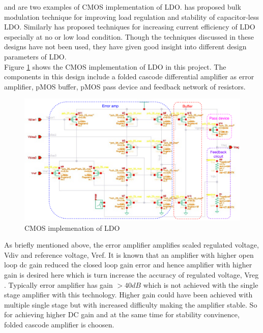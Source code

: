 \documentclass[12pt,a4paper,UKenglish]{article}
\begin{document}
\cite{ldo_bulkmod} and \cite{ldo_quiescent} are two examples of CMOS implementation of LDO. \cite{ldo_bulkmod} has proposed bulk modulation technique for improving load regulation and stability of capacitor-less LDO. Similarly \cite{ldo_quiescent} has  proposed techniques for increasing current efficiency of LDO especially at no or low load condition. Though the techniques discussed in these designs have not been used, they have given good insight into different design parameters of LDO.  \\

Figure \ref{ldo_cmos} shows the CMOS implementation of LDO in this project. The components in this design include a folded cascode differential amplifier as error amplifier, pMOS buffer, pMOS pass device and feedback network of resistors. 

\begin{figure}[htbp] %
   \centering
   \includegraphics[width=\textwidth]{img/ldo_2.pdf} 
   \caption{CMOS implemenation of LDO}
   \label{ldo_cmos}
\end{figure}

As briefly mentioned above, the error amplifier amplifies scaled regulated voltage, Vdiv and reference voltage, Vref. It is known that an amplifier with higher open loop \acrshort{dc} gain reduced the closed loop gain error and hence amplifier with higher gain is desired here which is turn increase the accuracy of regulated voltage, Vreg \cite{ldo_bulkmod}. Typically error amplifier has gain $> 40 dB$ which is not achieved with the single stage amplifier with this technology. Higher gain could have been achieved with multiple single stage but with increased difficulty making the amplifier stable. So for achieving higher DC gain and at the same time for stability convinence, folded cascode amplifier \cite[pp. xx]{razavi_2001} is choosen. \\
\end{document}
